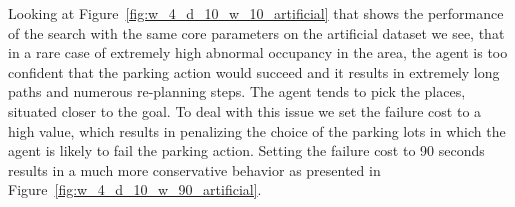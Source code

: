 \begin{figure}[t]
\begin{center}
\hspace{6mm}
\end{center}
\caption{}
\label{fig:long_wait_fast_walk}
\end{figure}

Looking at Figure~\ref{fig:w_4_d_10_w_10_artificial} that shows the
performance of the search with the same core parameters on the artificial
dataset we see, that in a rare case of extremely high abnormal occupancy in
the area, the agent is too confident that the parking action would succeed and
it results in extremely long paths and numerous re-planning steps. The agent
tends to pick the places, situated closer to the goal. To deal with this issue
we set the failure cost to a high value, which results in penalizing the
choice of the parking lots in which the agent is likely to fail the parking
action. Setting the failure cost to 90 seconds results in a much more
conservative behavior as presented in
Figure~\ref{fig:w_4_d_10_w_90_artificial}.

